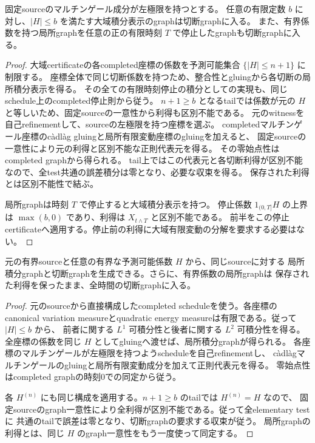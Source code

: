 \begin{proposition}[有界な大域certificateの包含]
固定sourceのマルチンゲール成分が左極限を持つとする。
任意の有限定数 $b$ に対し、$|H|\le b$ を満たす大域積分表示のgraphは切断graphに入る。
また、有界係数を持つ局所graphを任意の正の有限時刻 $T$ で停止したgraphも切断graphに入る。
\end{proposition}
\begin{proof}
大域certificateの各completed座標の係数を予測可能集合 $\{|H|\le n+1\}$ に制限する。
座標全体で同じ切断係数を持つため、整合性とgluingから各切断の局所積分表示を得る。
その全ての有限時刻停止の積分としての実現も、同じschedule上のcompleted停止則から従う。
$n+1\ge b$ となるtailでは係数が元の $H$ と等しいため、固定sourceの一意性から利得も区別不能である。
元のwitnessを自己refinementして、sourceの左極限を持つ座標を選ぶ。
completedマルチンゲール座標のcàdlàg gluingと局所有限変動座標のgluingを加えると、
固定sourceの一意性により元の利得と区別不能な正則代表元を得る。
その零始点性はcompleted graphから得られる。
tail上ではこの代表元と各切断利得が区別不能なので、全test共通の誤差積分は零となり、必要な収束を得る。
保存された利得とは区別不能性で結ぶ。

局所graphは時刻 $T$ で停止すると大域積分表示を持つ。
停止係数 $1_{(0,T]}H$ の上界は $\max(b,0)$ であり、利得は $X_{t\wedge T}$ と区別不能である。
前半をこの停止certificateへ適用する。停止前の利得に大域有限変動の分解を要求する必要はない。
\end{proof}

\begin{proposition}[有界予測可能係数の生成と局所graph全体の包含]
元の有界sourceと任意の有界な予測可能係数 $H$ から、同じsourceに対する
局所積分graphと切断graphを生成できる。さらに、有界係数の局所graphは
保存された利得を保ったまま、全時間の切断graphに入る。
\end{proposition}
\begin{proof}
元のsourceから直接構成したcompleted scheduleを使う。各座標のcanonical variation
measureとquadratic energy measureは有限である。従って $|H|\le b$ から、
前者に関する $L^1$ 可積分性と後者に関する $L^2$ 可積分性を得る。
全座標の係数を同じ $H$ としてgluingへ渡せば、局所積分graphが得られる。
各座標のマルチンゲールが左極限を持つようscheduleを自己refinementし、
càdlàgマルチンゲールのgluingと局所有限変動成分を加えて正則代表元を得る。
零始点性はcompleted graphの時刻0での同定から従う。

各 $H^{(n)}$ にも同じ構成を適用する。$n+1\ge b$ のtailでは $H^{(n)}=H$ なので、
固定sourceのgraph一意性により全利得が区別不能である。従って全elementary testに
共通のtailで誤差は零となり、切断graphの要求する収束が従う。
局所graphの利得とは、同じ $H$ のgraph一意性をもう一度使って同定する。

\end{proof}

